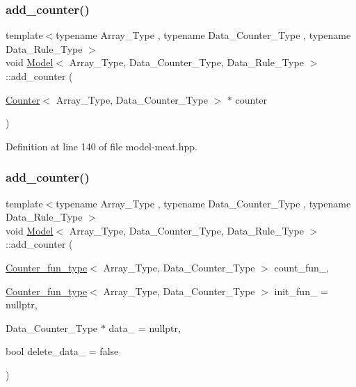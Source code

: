 \subsubsection{\texorpdfstring{add\+\_\+counter()}{add\_counter()}\hspace{0.1cm}{\footnotesize\ttfamily [2/3]}}
{\footnotesize\ttfamily template$<$typename Array\+\_\+\+Type , typename Data\+\_\+\+Counter\+\_\+\+Type , typename Data\+\_\+\+Rule\+\_\+\+Type $>$ \\
void \hyperlink{class_model}{Model}$<$ Array\+\_\+\+Type, Data\+\_\+\+Counter\+\_\+\+Type, Data\+\_\+\+Rule\+\_\+\+Type $>$\+::add\+\_\+counter (\begin{DoxyParamCaption}\item[{\hyperlink{class_counter}{Counter}$<$ Array\+\_\+\+Type, Data\+\_\+\+Counter\+\_\+\+Type $>$ $\ast$}]{counter }\end{DoxyParamCaption})\hspace{0.3cm}{\ttfamily [inline]}}



Definition at line 140 of file model-\/meat.\+hpp.

\mbox{\label{class_model_a4e4a18943bda513a844dc11aa088a698}} 
\subsubsection{\texorpdfstring{add\+\_\+counter()}{add\_counter()}\hspace{0.1cm}{\footnotesize\ttfamily [3/3]}}
{\footnotesize\ttfamily template$<$typename Array\+\_\+\+Type , typename Data\+\_\+\+Counter\+\_\+\+Type , typename Data\+\_\+\+Rule\+\_\+\+Type $>$ \\
void \hyperlink{class_model}{Model}$<$ Array\+\_\+\+Type, Data\+\_\+\+Counter\+\_\+\+Type, Data\+\_\+\+Rule\+\_\+\+Type $>$\+::add\+\_\+counter (\begin{DoxyParamCaption}\item[{\hyperlink{typedefs_8hpp_ac0160f52f564dea3ac033b374cffbfe7}{Counter\+\_\+fun\+\_\+type}$<$ Array\+\_\+\+Type, Data\+\_\+\+Counter\+\_\+\+Type $>$}]{count\+\_\+fun\+\_\+,  }\item[{\hyperlink{typedefs_8hpp_ac0160f52f564dea3ac033b374cffbfe7}{Counter\+\_\+fun\+\_\+type}$<$ Array\+\_\+\+Type, Data\+\_\+\+Counter\+\_\+\+Type $>$}]{init\+\_\+fun\+\_\+ = {\ttfamily nullptr},  }\item[{Data\+\_\+\+Counter\+\_\+\+Type $\ast$}]{data\+\_\+ = {\ttfamily nullptr},  }\item[{bool}]{delete\+\_\+data\+\_\+ = {\ttfamily false} }\end{DoxyParamCaption})\hspace{0.3cm}{\ttfamily [inline]}}



